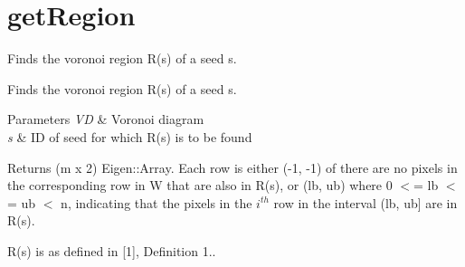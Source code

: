 \hypertarget{group__getRegion}{}\section{get\+Region}
\label{group__getRegion}


Finds the voronoi region R(s) of a seed s.  


Finds the voronoi region R(s) of a seed s. 


\begin{DoxyParams}{Parameters}
{\em VD} & Voronoi diagram \\
\hline
{\em s} & ID of seed for which R(s) is to be found \\
\hline
\end{DoxyParams}
\begin{DoxyReturn}{Returns}
(m x 2) Eigen\+::\+Array. Each row is either (-\/1, -\/1) of there are no pixels in the corresponding row in W that are also in R(s), or (lb, ub) where 0 $<$= lb $<$= ub $<$ n, indicating that the pixels in the $i^{th}$ row in the interval (lb, ub\mbox{]} are in R(s).
\end{DoxyReturn}
R(s) is as defined in \mbox{[}1\mbox{]}, Definition 1.. 